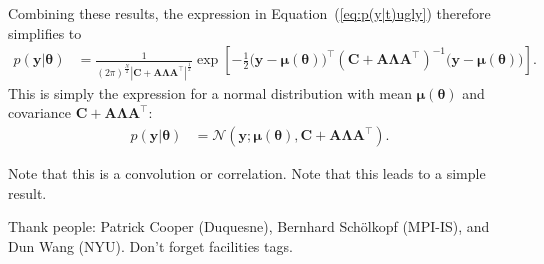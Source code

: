 \documentclass[modern]{rnaastex}
\renewcommand{\eqref}[1]{\ref{eq:#1}}
\newcommand{\Eq}[1]{Equation~(\eqref{#1})}
\newcommand{\eq}[1]{\Eq{#1}}
\newcommand{\eqlabel}[1]{\label{eq:#1}}
\newcommand{\bvec}[1]{{\ensuremath{\boldsymbol{#1}}}}
\newcommand{\Normal}{\ensuremath{\mathcal{N}}}
\newcommand{\mA}{\ensuremath{\bvec{A}}}
\newcommand{\mC}{\ensuremath{\bvec{C}}}
\newcommand{\mL}{\ensuremath{\bvec{\Lambda}}}
\newcommand{\vy}{\ensuremath{\bvec{y}}}
\newcommand{\vt}{\ensuremath{\bvec{\theta}}}
\newcommand{\vm}{\ensuremath{\bvec{\mu}(\bvec{\theta})}}
\begin{document}
%
Combining these results, the expression in \eq{p(y|t)ugly} therefore simplifies to
\begin{align}
\eqlabel{p(y|t)exp}
p(\vy | \vt) &= \frac{1}{(2 \pi)^\frac{N}{2}
                |\mC + \mA \mL \mA^\top|^\frac{1}{2}} 
                \exp \left[ -\frac{1}{2} \big( \vy - \vm \big)^\top 
                            (\mC + \mA \mL \mA^\top)^{-1} 
                            \big( \vy - \vm \big) 
                     \right].
\end{align}
This is simply the expression for a normal distribution with mean $\vm$ and covariance
$\mC + \mA \mL \mA^\top$:
%
\begin{align}
\eqlabel{p(y|t)normal}
p(\vy | \vt) &= \Normal (\vy; \vm, \mC + \mA \mL \mA^\top).
\end{align}

Note that this is a convolution or correlation. Note that this leads to a simple result.

\acknowledgements
Thank people:
  Patrick Cooper (Duquesne),
  Bernhard Sch\"olkopf (MPI-IS), and
  Dun Wang (NYU).
Don't forget facilities tags.


\end{document}
